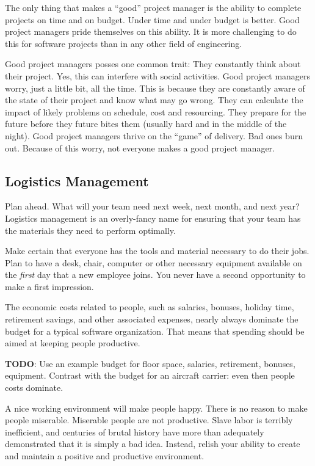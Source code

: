 The only thing that makes a ``good'' project manager is the ability to complete projects on time and on budget.  Under time and under budget is better.  Good project managers pride themselves on this ability. It is more challenging to do this for software projects than in any other field of engineering.

Good project managers posses one common trait:  They constantly think about their project.  Yes, this can interfere with social activities.  Good project managers worry, just a little bit, all the time.  This is because they are constantly aware of the state of their project and know what may go wrong.  They can calculate the impact of likely problems on schedule, cost and resourcing.  They prepare for the future before they future bites them (usually hard and in the middle of the night).  Good project managers thrive on the ``game'' of delivery.  Bad ones burn out.  Because of this worry, not everyone makes a good project manager.


\subsection{Logistics Management}

Plan ahead.  What will your team need next week, next month, and next year? Logistics management is an overly-fancy name for ensuring that your team has the materials they need to perform optimally.

Make certain that everyone has the tools and material necessary to do their jobs.  Plan to have a desk, chair, computer or other necessary equipment available on the \textit{first} day that a new employee joins. You never have a second opportunity to make a first impression.

The economic costs related to people, such as salaries, bonuses, holiday time, retirement savings, and other associated expenses, nearly always dominate the budget for a typical software organization. That means that spending should be aimed at keeping people productive.

\textbf{TODO}: Use an example budget
  for floor space, salaries, retirement, bonuses, equipment.
  Contrast with the budget for an aircraft carrier: even then
  people costs dominate.

A nice working environment will make people happy.  There is no reason to make people miserable.  Miserable people are not productive.  Slave labor is terribly inefficient, and centuries of brutal history have more than adequately demonstrated that it is simply a bad idea. Instead, relish your ability to create and maintain a positive and productive environment.

